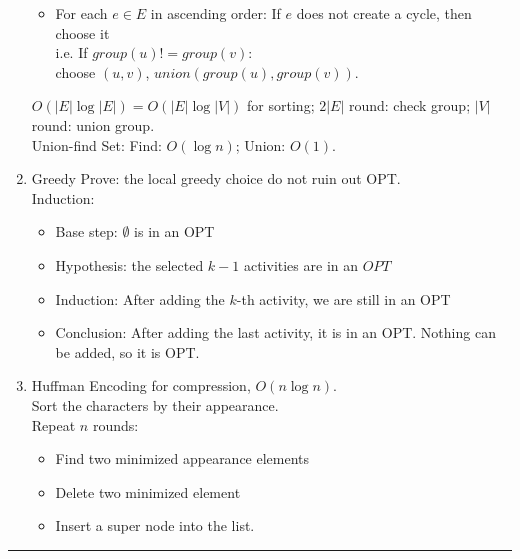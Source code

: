 \documentclass[10pt, a4paper, twocolumn]{article}
\begin{document}
\begin{enumerate}[leftmargin = 12pt, topsep = 0pt, itemsep=0pt, partopsep = 0pt]
\begin{itemize}[leftmargin = 12pt, topsep = 0pt, itemsep=0pt, partopsep = 0pt]
        \item For each $e\in E$ in ascending order: If $e$ does not create a cycle, then choose it \\
        i.e. If $group(u)!=group(v)$:\\ choose $(u,v)$, $union(group(u),group(v))$.
        \end{itemize}
        $O(|E|\log|E|)=O(|E|\log|V|)$ for sorting; $2|E|$ round: check group; $|V|$ round: union group.\\
        Union-find Set: Find: $O(\log n)$; Union: $O(1)$.
    \item Greedy Prove: the local greedy choice do not ruin out OPT.\\
        Induction:
        \begin{itemize}[leftmargin = 12pt, topsep = 0pt, itemsep=0pt, partopsep = 0pt]
        \item Base step: $\emptyset$ is in an OPT
        \item Hypothesis: the selected $k-1$ activities are in an $OPT$
        \item Induction: After adding the $k$-th activity, we are still in an OPT
        \item Conclusion: After adding the last activity, it is in an OPT. Nothing can be added, so it is OPT.
        \end{itemize}
    \item Huffman Encoding for compression, $O(n\log n)$.\\
        Sort the characters by their appearance.\\
        Repeat $n$ rounds:
        \begin{itemize}[leftmargin = 12pt, topsep = 0pt, itemsep=0pt, partopsep = 0pt]
        \item Find two minimized appearance elements
        \item Delete two minimized element
        \item Insert a super node into the list.
        \end{itemize}
\end{enumerate}
\vspace{0.1cm}
\hrule
\end{document}
